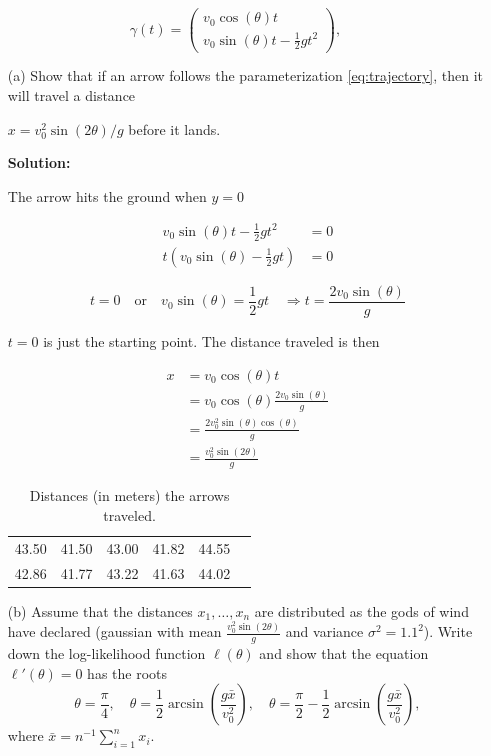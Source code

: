 \documentclass{article}
\begin{document}
\begin{equation}
    \label{eq:trajectory}
    \gamma(t) = \left( \begin{array}{c} 
    v_0 \cos(\theta) t \\ 
    v_0 \sin(\theta) t - \frac{1}{2} g t^2 
    \end{array} \right),
\end{equation}

\begin{enumerate}
    \item[(a)] Show that if an arrow follows the parameterization \ref{eq:trajectory}, then it will travel a distance 
    \item[] $x = v_0^2 \sin(2\theta)/g$ before it lands.


\textbf{Solution:}
\par
The arrow hits the ground when $y=0$

\begin{align*}
    v_0 \sin(\theta) t - \frac{1}{2} g t^2 &= 0\\
    t(v_0 \sin(\theta) - \frac{1}{2} g t) &= 0
\end{align*}

\[
    t = 0 \quad \text{or} \quad v_0 \sin(\theta) = \frac{1}{2} g t \quad \Rightarrow t = \frac{2v_0 \sin(\theta)}{g}
\]

$t=0$ is just the starting point. The distance traveled is then



\begin{align*}
    x &= v_0 \cos(\theta) t\\
    &= v_0 \cos(\theta) \frac{2v_0 \sin(\theta)}{g}\\
    &= \frac{2v_0^2 \sin(\theta) \cos(\theta)}{g}\\
    &= \frac{v_0^2 \sin(2\theta)}{g}
\end{align*}



\begin{table}[h!]
    \centering
    \begin{tabular}{|c|c|c|c|c|c|}
    \hline
    43.50 & 41.50 & 43.00 & 41.82 & 44.55 \\
    42.86 & 41.77 & 43.22 & 41.63 & 44.02 \\
    \hline
    \end{tabular}
    \caption{Distances (in meters) the arrows traveled.}
    \end{table}

    
\item[(b)]
Assume that the distances $x_1, \dots, x_n$ are distributed as the gods of wind have declared 
(gaussian with mean $\frac{v_0^2 \sin(2\theta)}{g}$  and variance $ \sigma^2 = 1.1^2$). Write down the log-likelihood function $\ell(\theta)$ and show that the equation $\ell'(\theta) = 0$ has the roots
\[
\theta = \frac{\pi}{4}, \quad \theta = \frac{1}{2} \arcsin\left(\frac{g\bar{x}}{v_0^2}\right), \quad \theta = \frac{\pi}{2} - \frac{1}{2} \arcsin\left(\frac{g\bar{x}}{v_0^2}\right),
\]
where $\bar{x} = n^{-1}\sum_{i=1}^n x_i$.



\end{enumerate}
\end{document}
